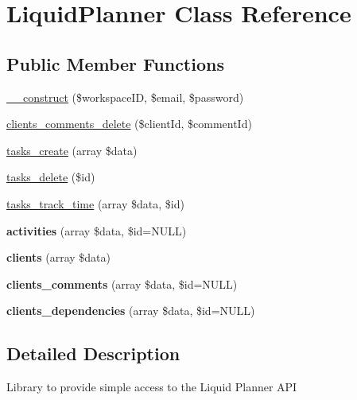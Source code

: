 \hypertarget{classLiquidPlanner}{
\section{LiquidPlanner Class Reference}
\label{classLiquidPlanner}
}
\subsection*{Public Member Functions}
\begin{DoxyCompactItemize}
\item 
\hyperlink{classLiquidPlanner_a0d0abee95b7d095d88f080a1f5debcd1}{\_\-\_\-construct} (\$workspaceID, \$email, \$password)
\item 
\hyperlink{classLiquidPlanner_a20fb803d7667ba23515ac730b57d3be9}{clients\_\-comments\_\-delete} (\$clientId, \$commentId)
\item 
\hyperlink{classLiquidPlanner_a91a8d60f702c9b774e292c734df4f47f}{tasks\_\-create} (array \$data)
\item 
\hyperlink{classLiquidPlanner_adb51bedafa48a1945b20a3a546521bb5}{tasks\_\-delete} (\$id)
\item 
\hyperlink{classLiquidPlanner_acb040a00fc036f40ada6c04a1f041a8e}{tasks\_\-track\_\-time} (array \$data, \$id)
\item 
\hypertarget{classLiquidPlanner_acac28a1520fd8b2111c9c972976f5a15}{
{\bfseries activities} (array \$data, \$id=NULL)}
\label{classLiquidPlanner_acac28a1520fd8b2111c9c972976f5a15}

\item 
\hypertarget{classLiquidPlanner_a5847d38529f21f5490c296b80a041b23}{
{\bfseries clients} (array \$data)}
\label{classLiquidPlanner_a5847d38529f21f5490c296b80a041b23}

\item 
\hypertarget{classLiquidPlanner_a2f4602d4a71e0bd752f907cf5d0ed64d}{
{\bfseries clients\_\-comments} (array \$data, \$id=NULL)}
\label{classLiquidPlanner_a2f4602d4a71e0bd752f907cf5d0ed64d}

\item 
\hypertarget{classLiquidPlanner_a232a622b6339974506a11ec8078aaf26}{
{\bfseries clients\_\-dependencies} (array \$data, \$id=NULL)}
\label{classLiquidPlanner_a232a622b6339974506a11ec8078aaf26}

\end{DoxyCompactItemize}


\subsection{Detailed Description}
Library to provide simple access to the Liquid Planner API

